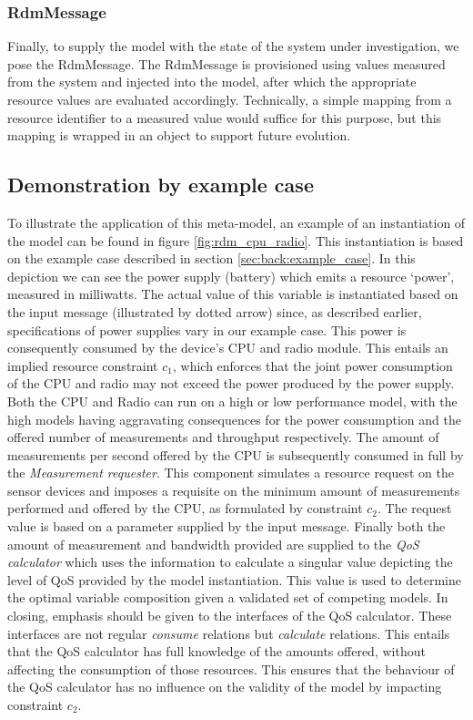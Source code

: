 \subsubsection{RdmMessage}
Finally, to supply the model with the state of the system under investigation, we pose the RdmMessage. The RdmMessage is provisioned using values measured from the system and injected into the model, after which the appropriate resource values are evaluated accordingly. Technically, a simple mapping from a resource identifier to a measured value would suffice for this purpose, but this mapping is wrapped in an object to support future evolution.


\subsection{Demonstration by example case}
To illustrate the application of this meta-model, an example of an instantiation of the model can be found in figure \ref{fig:rdm_cpu_radio}. This instantiation is based on the example case described in section \ref{sec:back:example_case}. In this depiction we can see the power supply (battery) which emits a resource `power', measured in milliwatts. The actual value of this variable is instantiated based on the input message (illustrated by dotted arrow) since, as described earlier, specifications of power supplies vary in our example case. This power is consequently consumed by the device's CPU and radio module. This entails an implied resource constraint $c_1$, which enforces that the joint power consumption of the CPU and radio may not exceed the power produced by the power supply. Both the CPU and Radio can run on a high or low performance model, with the high models having aggravating consequences for the power consumption and the offered number of measurements and throughput respectively. The amount of measurements per second offered by the CPU is subsequently consumed in full by the \emph{Measurement requester}. This component simulates a resource request on the sensor devices and imposes a requisite on the minimum amount of measurements performed and offered by the CPU, as formulated by constraint $c_2$. The request value is based on a parameter supplied by the input message. Finally both the amount of measurement and bandwidth provided are supplied to the \emph{QoS calculator} which uses the information to calculate a singular value depicting the level of QoS provided by the model instantiation. This value is used to determine the optimal variable composition given a validated set of competing models. In closing, emphasis should be given to the interfaces of the QoS calculator. These interfaces are not regular \emph{consume} relations but \emph{calculate} relations. This entails that the QoS calculator has full knowledge of the amounts offered, without affecting the consumption of those resources. This ensures that the behaviour of the QoS calculator has no influence on the validity of the model by impacting constraint $c_2$.

